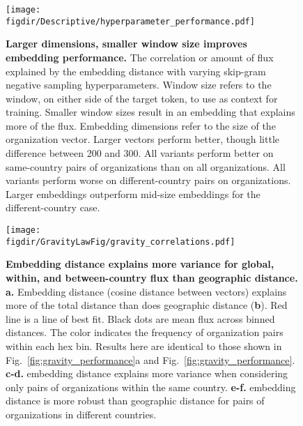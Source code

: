 \documentclass[12pt]{article} %
\def\figdir{../Figs}
\begin{document}
%
%
\begin{figure}[p!]
    \centering
    \label{fig:supp:hyperparams}
    \texttt{[image: \\figdir/Descriptive/hyperparameter\_performance.pdf]}
    \caption{
        \textbf{Larger dimensions, smaller window size improves embedding performance.}
        The correlation or amount of flux explained by the embedding distance with varying skip-gram negative sampling hyperparameters.
        Window size refers to the window, on either side of the target token, to use as context for training.
        Smaller window sizes result in an embedding that explains more of the flux.
        Embedding dimensions refer to the size of the organization vector.
        Larger vectors perform better, though little difference between 200 and 300.
        All variants perform better on same-country pairs of organizations than on all organizations.
        All variants perform worse on different-country pairs on organizations.
        Larger embeddings outperform mid-size embeddings for the different-country case.
    }
\end{figure}

\newpage
%
%
\begin{figure}[p!]
    \centering
    \label{fig:supp:gravity_correlation}
    \texttt{[image: \\figdir/GravityLawFig/gravity\_correlations.pdf]}
    \caption{
        \textbf{Embedding distance explains more variance for global, within, and between-country flux than geographic distance.}
        \textbf{a.}
        Embedding distance (cosine distance between vectors) explains more of the total distance than does geographic distance (\textbf{b}).
        Red line is a line of best fit.
        Black dots are mean flux across binned distances.
        The color indicates the frequency of organization pairs within each hex bin.
        Results here are identical to those shown in Fig.~\ref{fig:gravity_performance}a and Fig.~\ref{fig:gravity_performance}.
        \textbf{c-d.}    embedding distance explains more variance when considering only pairs of organizations within the same country.
        \textbf{e-f.} embedding distance is more robust than geographic distance for pairs of organizations in different countries.
    }
\end{figure}
\end{document}
